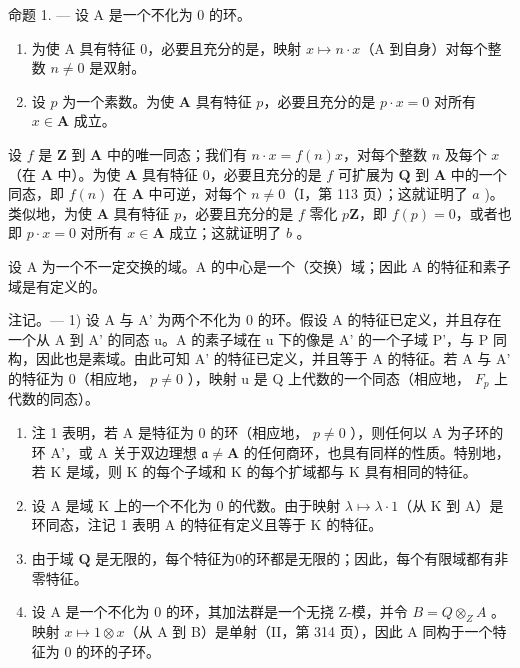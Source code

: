 命题 1. --- 设 A 是一个不化为 0 的环。

\begin{enumerate}
\def\labelenumi{\alph{enumi})}
\item
  为使 A 具有特征 0，必要且充分的是，映射 \(x \mapsto n \cdot x\)（A 到自身）对每个整数 \(n \neq 0\) 是双射。
\item
  设 \(p\) 为一个素数。为使 \(\mathbf{A}\) 具有特征 \(p\)，必要且充分的是 \(p \cdot x = 0\) 对所有 \(x \in \mathbf{A}\) 成立。
\end{enumerate}

设 \(f\) 是 \(\mathbf{Z}\) 到 \(\mathbf{A}\) 中的唯一同态；我们有 \(n \cdot x = f(n)x\)，对每个整数 \(n\) 及每个 \(x\) （在 \(\mathbf{A}\) 中）。为使 \(\mathbf{A}\) 具有特征 0，必要且充分的是 \(f\) 可扩展为 \(\mathbf{Q}\) 到 \(\mathbf{A}\) 中的一个同态，即 \(f(n)\) 在 \(\mathbf{A}\) 中可逆，对每个 \(n \neq 0\)（I，第 113 页）；这就证明了 \(a\) )。类似地，为使 \(\mathbf{A}\) 具有特征 \(p\)，必要且充分的是 \(f\) 零化 \(p\mathbf{Z}\)，即 \(f(p) = 0\)，或者也即 \(p \cdot x = 0\) 对所有 \(x \in \mathbf{A}\) 成立；这就证明了 \(b\) 。

设 A 为一个不一定交换的域。A 的中心是一个（交换）域；因此 A 的特征和素子域是有定义的。

注记。--- 1) 设 A 与 A' 为两个不化为 0 的环。假设 A 的特征已定义，并且存在一个从 A 到 A' 的同态 u。A 的素子域在 u 下的像是 A' 的一个子域 P'，与 P 同构，因此也是素域。由此可知 A' 的特征已定义，并且等于 A 的特征。若 A 与 A' 的特征为 0（相应地， \(p \neq 0\) ），映射 u 是 Q 上代数的一个同态（相应地， \(F_{p}\) 上代数的同态）。

\begin{enumerate}
\def\labelenumi{\arabic{enumi})}
\setcounter{enumi}{1}
\item
  注 1 表明，若 A 是特征为 0 的环（相应地， \(p \neq 0\) ），则任何以 A 为子环的环 A'，或 A 关于双边理想 \(\mathfrak{a} \neq \mathbf{A}\) 的任何商环，也具有同样的性质。特别地，若 K 是域，则 K 的每个子域和 K 的每个扩域都与 K 具有相同的特征。
\item
  设 A 是域 K 上的一个不化为 0 的代数。由于映射 \(\lambda \mapsto \lambda \cdot 1\)（从 K 到 A）是环同态，注记 1 表明 A 的特征有定义且等于 K 的特征。
\item
  由于域 \(\mathbf{Q}\) 是无限的，每个特征为0的环都是无限的；因此，每个有限域都有非零特征。
\item
  设 A 是一个不化为 0 的环，其加法群是一个无挠 Z-模，并令 \(B = Q \otimes_{Z} A\) 。映射 \(x \mapsto 1 \otimes x\)（从 A 到 B）是单射（II，第 314 页），因此 A 同构于一个特征为 0 的环的子环。
\end{enumerate}

